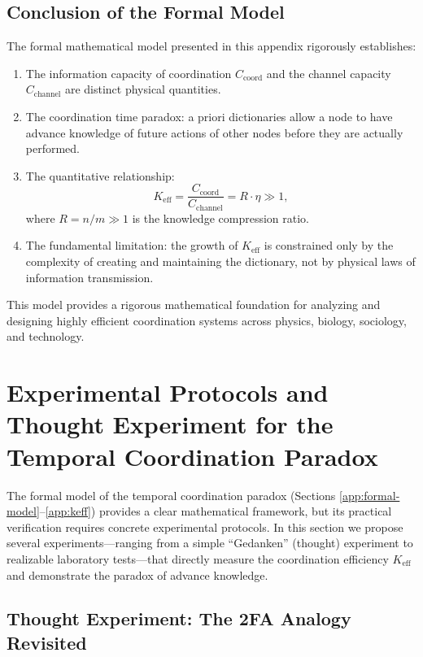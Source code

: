 \documentclass[12pt]{article}
\begin{document}
	\subsection{Conclusion of the Formal Model}
	
	The formal mathematical model presented in this appendix rigorously establishes:
	
	\begin{enumerate}
		\item The information capacity of coordination $C_{\text{coord}}$ and the channel capacity $C_{\text{channel}}$ are distinct physical quantities.
		
		\item The coordination time paradox: a priori dictionaries allow a node to have advance knowledge of future actions of other nodes before they are actually performed.
		
		\item The quantitative relationship:
		\[
		K_{\mathrm{eff}} = \frac{C_{\text{coord}}}{C_{\text{channel}}} = R \cdot \eta \gg 1,
		\]
		where $R = n/m \gg 1$ is the knowledge compression ratio.
		
		\item The fundamental limitation: the growth of $K_{\mathrm{eff}}$ is constrained only by the complexity of creating and maintaining the dictionary, not by physical laws of information transmission.
	\end{enumerate}
	
	This model provides a rigorous mathematical foundation for analyzing and designing highly efficient coordination systems across physics, biology, sociology, and technology.
	
	
	\section{Experimental Protocols and Thought Experiment for the Temporal Coordination Paradox}
	\label{app:experimental-protocols}
	
	The formal model of the temporal coordination paradox (Sections \ref{app:formal-model}--\ref{app:keff}) provides a clear mathematical framework, but its practical verification requires concrete experimental protocols. In this section we propose several experiments—ranging from a simple ``Gedanken'' (thought) experiment to realizable laboratory tests—that directly measure the coordination efficiency \(K_{\mathrm{eff}}\) and demonstrate the paradox of advance knowledge.
	
	\subsection{Thought Experiment: The 2FA Analogy Revisited}
	\label{subsec:thought-2fa}
	
\end{document}
